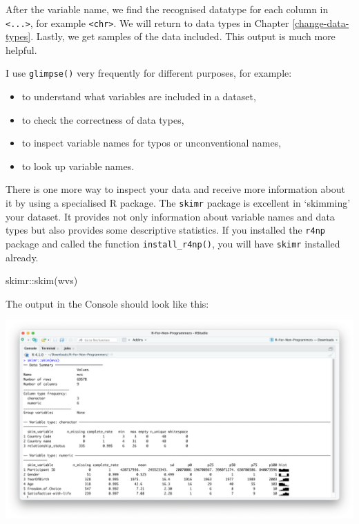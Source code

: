 \documentclass[
]{book}
\newenvironment{Shaded}{\begin{snugshade}}{\end{snugshade}}
\newcommand{\FunctionTok}[1]{\textcolor[rgb]{0.00,0.00,0.00}{#1}}
\newcommand{\NormalTok}[1]{#1}
\newcommand{\SpecialCharTok}[1]{\textcolor[rgb]{0.00,0.00,0.00}{#1}}
\begin{document}
After the variable name, we find the recognised datatype for each column in \texttt{\textless{}...\textgreater{}}, for example \texttt{\textless{}chr\textgreater{}}. We will return to data types in Chapter \ref{change-data-types}. Lastly, we get samples of the data included. This output is much more helpful.

I use \texttt{glimpse()} very frequently for different purposes, for example:

\begin{itemize}
\item
  to understand what variables are included in a dataset,
\item
  to check the correctness of data types,
\item
  to inspect variable names for typos or unconventional names,
\item
  to look up variable names.
\end{itemize}

There is one more way to inspect your data and receive more information about it by using a specialised R package. The \texttt{skimr} package is excellent in `skimming' your dataset. It provides not only information about variable names and data types but also provides some descriptive statistics. If you installed the \texttt{r4np} package and called the function \texttt{install\_r4np()}, you will have \texttt{skimr} installed already.

\begin{Shaded}
\begin{Highlighting}[]
\NormalTok{skimr}\SpecialCharTok{::}\FunctionTok{skim}\NormalTok{(wvs)}
\end{Highlighting}
\end{Shaded}

The output in the Console should look like this:

\includegraphics{images/chapter_07_img/02_skimr_output/skimr_output.png}
\end{document}
